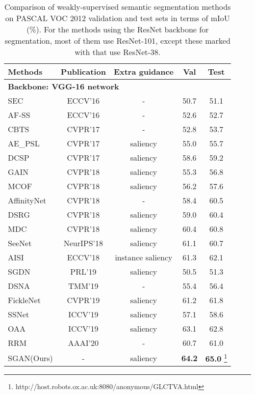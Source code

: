 \documentclass[journal]{IEEEtran}
\begin{document}
\begin{table}[tbhp]
	\begin{minipage}{1\linewidth}
		\centering
		\caption{Comparison of weakly-supervised semantic segmentation methods on PASCAL VOC 2012 validation and test sets in terms of mIoU (\%). For the methods using the ResNet backbone for segmentation, most of them use ResNet-101, except these marked with  that use ResNet-38.}
		\label{tab:comp}
		\begin{tabular}{lcccc}
			\hline Methods                             &Publication  & Extra guidance  &Val   &Test \\ \hline \multicolumn{4}{l}{\textbf{Backbone: VGG-16 network}} \\ 
			SEC~\cite{kolesnikov2016seed}       &ECCV'16     & -                  &50.7  &51.1 \\
			AF-SS~\cite{qi2016augmented}    	&ECCV'16     & -                  &52.6  &52.7 \\
			CBTS~\cite{roy2017combining}    	&CVPR'17     & -                  &52.8  &53.7 \\
			AE\_PSL~\cite{wei2017object}    	&CVPR'17     & saliency       &55.0  &55.7 \\
			DCSP~\cite{chaudhry2017discovering} &CVPR'17	  & saliency       &58.6  &59.2 \\
			GAIN~\cite{li2018tell} 				&CVPR'18	  & saliency 				   &55.3  &56.8 \\ 
			MCOF~\cite{wang2018weakly} 			&CVPR'18	  & saliency 	   &56.2  &57.6 \\
			AffinityNet~\cite{ahn2018learning}  &CVPR'18	  & - 				   &58.4  &60.5 \\
			DSRG~\cite{huang2018weakly} 		&CVPR'18	  & saliency 	   &59.0  &60.4 \\
			MDC~\cite{wei2018revisiting} 		&CVPR'18	  & saliency 	   &60.4  &60.8 \\
			SeeNet~\cite{hou2018self} 			&NeurIPS'18  & saliency      &61.1  &60.7 \\
			AISI~\cite{fan2018associating} 		&ECCV'18	  & instance saliency  &61.3  &62.1 \\
			SGDN~\cite{Sun2019saliency} 		&PRL'19	  & saliency  	   &50.5  &51.3 \\
			DSNA~\cite{Zhang2019attention} 		&TMM'19 	  & -    &55.4  &56.4 \\
			FickleNet~\cite{lee2019ficklenet}   &CVPR'19	  & saliency  	   &61.2  &61.8 \\ 
			SSNet~\cite{Zeng_2019_ICCV} 			&ICCV'19	  & saliency    &57.1  &58.6 \\
			OAA~\cite{jiang2019integral} 		&ICCV'19	  & saliency  	   &63.1  &62.8 \\
			RRM~\cite{Zhang2020}						&AAAI'20		& -	& 60.7 & 61.0 \\
			SGAN(Ours) &- & saliency   &\textbf{64.2} &\textbf{65.0} \footnote{http://host.robots.ox.ac.uk:8080/anonymous/GLCTVA.html} \\ \hline



\end{tabular}
\end{minipage}
\end{table}
\end{document}
